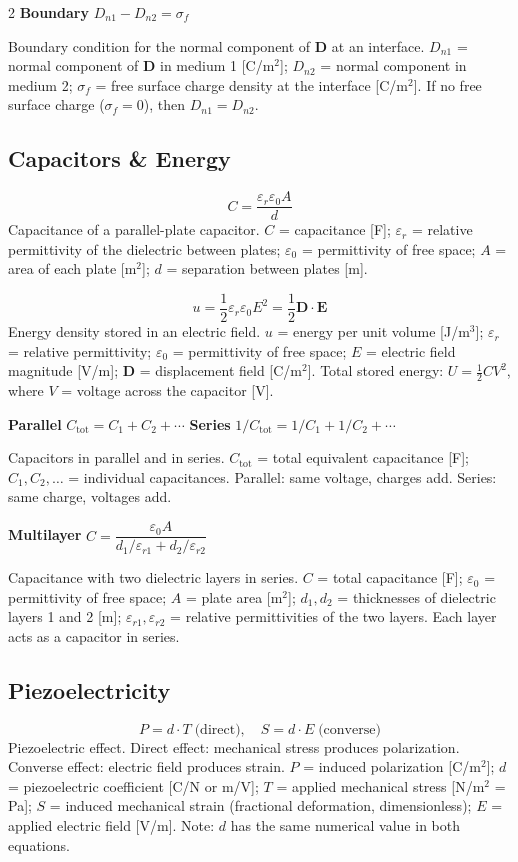 \documentclass[9pt]{extarticle}
\newcommand{\eqlabel}[1]{\textbf{\scriptsize #1}\;}
\newcommand{\desc}[1]{{\small\color{desc}#1}}
\begin{document}
\begin{multicols}{2}
\eqlabel{Boundary} $D_{n1} - D_{n2} = \sigma_f$

\desc{Boundary condition for the normal component of $\mathbf{D}$ at an interface. $D_{n1}$ = normal component of $\mathbf{D}$ in medium 1 [C/m$^2$]; $D_{n2}$ = normal component in medium 2; $\sigma_f$ = free surface charge density at the interface [C/m$^2$]. If no free surface charge ($\sigma_f = 0$), then $D_{n1} = D_{n2}$.}

\subsection{Capacitors \& Energy}
\[C = \frac{\varepsilon_r\varepsilon_0 A}{d}\]
\desc{Capacitance of a parallel-plate capacitor. $C$ = capacitance [F]; $\varepsilon_r$ = relative permittivity of the dielectric between plates; $\varepsilon_0$ = permittivity of free space; $A$ = area of each plate [m$^2$]; $d$ = separation between plates [m].}

\[u = \frac{1}{2}\varepsilon_r\varepsilon_0 E^2 = \frac{1}{2}\mathbf{D}\cdot\mathbf{E}\]
\desc{Energy density stored in an electric field. $u$ = energy per unit volume [J/m$^3$]; $\varepsilon_r$ = relative permittivity; $\varepsilon_0$ = permittivity of free space; $E$ = electric field magnitude [V/m]; $\mathbf{D}$ = displacement field [C/m$^2$]. Total stored energy: $U = \frac{1}{2}CV^2$, where $V$ = voltage across the capacitor [V].}

\eqlabel{Parallel} $C_{\text{tot}} = C_1 + C_2 + \cdots$
\quad
\eqlabel{Series} $1/C_{\text{tot}} = 1/C_1 + 1/C_2 + \cdots$

\desc{Capacitors in parallel and in series. $C_{\text{tot}}$ = total equivalent capacitance [F]; $C_1, C_2, \ldots$ = individual capacitances. Parallel: same voltage, charges add. Series: same charge, voltages add.}

\eqlabel{Multilayer} $C = \dfrac{\varepsilon_0 A}{d_1/\varepsilon_{r1} + d_2/\varepsilon_{r2}}$

\desc{Capacitance with two dielectric layers in series. $C$ = total capacitance [F]; $\varepsilon_0$ = permittivity of free space; $A$ = plate area [m$^2$]; $d_1, d_2$ = thicknesses of dielectric layers 1 and 2 [m]; $\varepsilon_{r1}, \varepsilon_{r2}$ = relative permittivities of the two layers. Each layer acts as a capacitor in series.}

\subsection{Piezoelectricity}
\[P = d\cdot T \;\text{(direct)},\quad S = d\cdot E \;\text{(converse)}\]
\desc{Piezoelectric effect. Direct effect: mechanical stress produces polarization. Converse effect: electric field produces strain. $P$ = induced polarization [C/m$^2$]; $d$ = piezoelectric coefficient [C/N or m/V]; $T$ = applied mechanical stress [N/m$^2$ = Pa]; $S$ = induced mechanical strain (fractional deformation, dimensionless); $E$ = applied electric field [V/m]. Note: $d$ has the same numerical value in both equations.}


\end{multicols}
\end{document}
